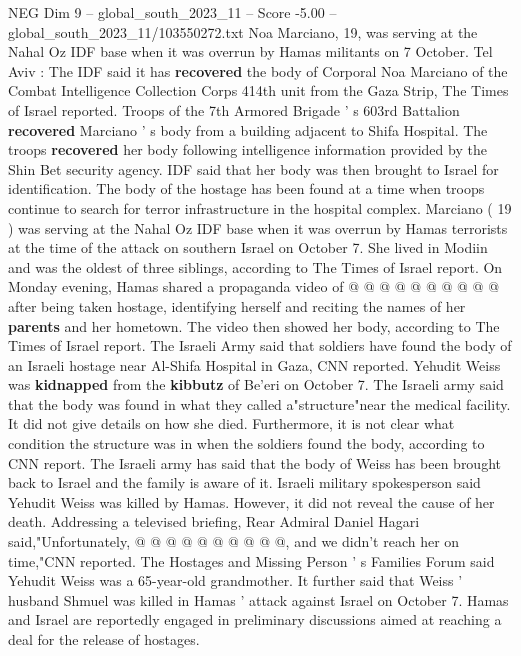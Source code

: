 \begin{textsample}{NEG Dim 9 – global\_south\_2023\_11 – Score -5.00 – global\_south\_2023\_11/103550272.txt}  \label{ex:f9_neg_316}
Noa Marciano, 19, was serving at the Nahal Oz IDF base when it was overrun by Hamas militants on 7 October.
Tel Aviv : The IDF said it has \textbf{recovered} the body of Corporal Noa Marciano of the Combat Intelligence Collection Corps 414th unit from the Gaza Strip, The Times of Israel reported.
Troops of the 7th Armored Brigade ' s 603rd Battalion \textbf{recovered} Marciano ' s body from a building adjacent to Shifa Hospital.
The troops \textbf{recovered} her body following intelligence information provided by the Shin Bet security agency.
IDF said that her body was then brought to Israel for identification.
The body of the hostage has been found at a time when troops continue to search for terror infrastructure in the hospital complex.
Marciano ( 19 ) was serving at the Nahal Oz IDF base when it was overrun by Hamas terrorists at the time of the attack on southern Israel on October 7.
She lived in Modiin and was the oldest of three siblings, according to The Times of Israel report.
On Monday evening, Hamas shared a propaganda video of @ @ @ @ @ @ @ @ @ @ after being taken hostage, identifying herself and reciting the names of her \textbf{parents} and her hometown.
The video then showed her body, according to The Times of Israel report.
The Israeli Army said that soldiers have found the body of an Israeli hostage near Al-Shifa Hospital in Gaza, CNN reported.
Yehudit Weiss was \textbf{kidnapped} from the \textbf{kibbutz} of Be'eri on October 7.
The Israeli army said that the body was found in what they called a"structure"near the medical facility.
It did not give details on how she died.
Furthermore, it is not clear what condition the structure was in when the soldiers found the body, according to CNN report.
The Israeli army has said that the body of Weiss has been brought back to Israel and the family is aware of it.
Israeli military spokesperson said Yehudit Weiss was killed by Hamas.
However, it did not reveal the cause of her death.
Addressing a televised briefing, Rear Admiral Daniel Hagari said,"Unfortunately, @ @ @ @ @ @ @ @ @ @, and we didn't reach her on time,"CNN reported.
The Hostages and Missing Person ' s Families Forum said Yehudit Weiss was a 65-year-old grandmother.
It further said that Weiss ' husband Shmuel was killed in Hamas ' attack against Israel on October 7.
Hamas and Israel are reportedly engaged in preliminary discussions aimed at reaching a deal for the release of hostages.

\end{textsample}
